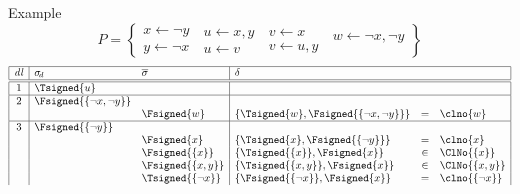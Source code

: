 \begin{frame}{Example}
  \[
    P
    =
    \left\{
      \begin{array}{l}
        x  \leftarrow  \neg y\\
        y  \leftarrow  \neg x
      \end{array}
      \
      \begin{array}{l}
        u  \leftarrow x,y\\
        u  \leftarrow v
      \end{array}
      \
      \begin{array}{l}
        v  \leftarrow x\\
        v  \leftarrow u,y
      \end{array}
      \
      \begin{array}{l}
        w  \leftarrow \neg x,\neg y\\
        \mbox{~}
      \end{array}
    \right\}
  \]
  \medskip\footnotesize
  \[
    \begin{array}[b]{|c|ll|lcl|}
      \hline
      \mathit{dl}&\sigma_{\!d}               &\overline{\sigma}    &\delta                                           &   &
      \\\hline\hline
      1          &\Tsigned{u}                &                     &                                                 &   &
      \\\hline
      2          &\Fsigned{\{\neg x,\neg y\}}&                     &                                                 &   &
      \\
                 &                           &\Fsigned{w}          &\{\Tsigned{w},\Fsigned{\{\neg x,\neg y\}}\}      & = &\clno{w}
      \\\hline
      3          &\Fsigned{\{\neg y\}}       &                     &                                                 &   &
      \\
                 &                           &\Fsigned{x}          &\{\Tsigned{x},\Fsigned{\{\neg y\}}\}             & = &\clno{x}
      \\
                 &                           &\Fsigned{\{x\}}      &\{\Tsigned{\{x\}},\Fsigned{x}\}                  &\in&\ClNo{\{x\}}
      \\
                 &                           &\Fsigned{\{x,y\}}    &\{\Tsigned{\{x,y\}},\Fsigned{x}\}                &\in&\ClNo{\{x,y\}}
      \\
                 &                           &\Tsigned{\{\neg x\}} &\{\Fsigned{\{\neg x\}},\Fsigned{x}\}             & = &\clno{\{\neg x\}}

\end{array}\]
\end{frame}
